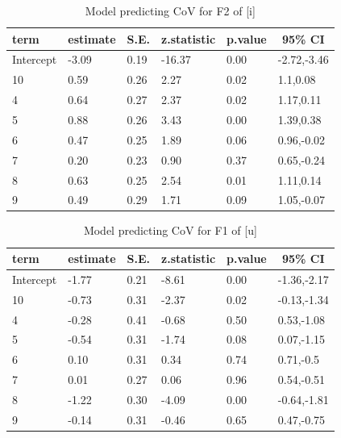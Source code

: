\documentclass[
]{article}
\begin{document}
\begin{table}[tbp]

\begin{center}
\begin{threeparttable}

\caption{\label{tab:f2-i-model}Model predicting CoV for F2 of [i]}

\begin{tabular}{llllll}
\toprule
term & \multicolumn{1}{c}{estimate} & \multicolumn{1}{c}{S.E.} & \multicolumn{1}{c}{z.statistic} & \multicolumn{1}{c}{p.value} & \multicolumn{1}{c}{95\% CI}\\
\midrule
Intercept & -3.09 & 0.19 & -16.37 & 0.00 & -2.72,-3.46\\
10 & 0.59 & 0.26 & 2.27 & 0.02 & 1.1,0.08\\
4 & 0.64 & 0.27 & 2.37 & 0.02 & 1.17,0.11\\
5 & 0.88 & 0.26 & 3.43 & 0.00 & 1.39,0.38\\
6 & 0.47 & 0.25 & 1.89 & 0.06 & 0.96,-0.02\\
7 & 0.20 & 0.23 & 0.90 & 0.37 & 0.65,-0.24\\
8 & 0.63 & 0.25 & 2.54 & 0.01 & 1.11,0.14\\
9 & 0.49 & 0.29 & 1.71 & 0.09 & 1.05,-0.07\\
\bottomrule
\end{tabular}

\end{threeparttable}
\end{center}

\end{table}

\begin{table}[tbp]

\begin{center}
\begin{threeparttable}

\caption{\label{tab:f1-u-model}Model predicting CoV for F1 of [u]}

\begin{tabular}{llllll}
\toprule
term & \multicolumn{1}{c}{estimate} & \multicolumn{1}{c}{S.E.} & \multicolumn{1}{c}{z.statistic} & \multicolumn{1}{c}{p.value} & \multicolumn{1}{c}{95\% CI}\\
\midrule
Intercept & -1.77 & 0.21 & -8.61 & 0.00 & -1.36,-2.17\\
10 & -0.73 & 0.31 & -2.37 & 0.02 & -0.13,-1.34\\
4 & -0.28 & 0.41 & -0.68 & 0.50 & 0.53,-1.08\\
5 & -0.54 & 0.31 & -1.74 & 0.08 & 0.07,-1.15\\
6 & 0.10 & 0.31 & 0.34 & 0.74 & 0.71,-0.5\\
7 & 0.01 & 0.27 & 0.06 & 0.96 & 0.54,-0.51\\
8 & -1.22 & 0.30 & -4.09 & 0.00 & -0.64,-1.81\\
9 & -0.14 & 0.31 & -0.46 & 0.65 & 0.47,-0.75\\
\bottomrule
\end{tabular}

\end{threeparttable}
\end{center}

\end{table}
\end{document}
